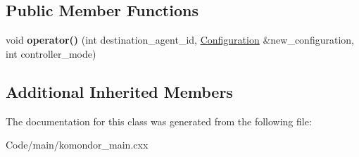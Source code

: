 \subsection*{Public Member Functions}
\begin{DoxyCompactItemize}
\item 
\mbox{\label{classcompcxx__CentralController__26_1_1my__CentralController__outportSendConfigurationToAgent__f__t_a1a1dc31d5cfabcd1d2e87cf354ef30af}} 
void {\bfseries operator()} (int destination\+\_\+agent\+\_\+id, \hyperlink{structConfiguration}{Configuration} \&new\+\_\+configuration, int controller\+\_\+mode)
\end{DoxyCompactItemize}
\subsection*{Additional Inherited Members}


The documentation for this class was generated from the following file\+:\begin{DoxyCompactItemize}
\item 
Code/main/komondor\+\_\+main.\+cxx\end{DoxyCompactItemize}
